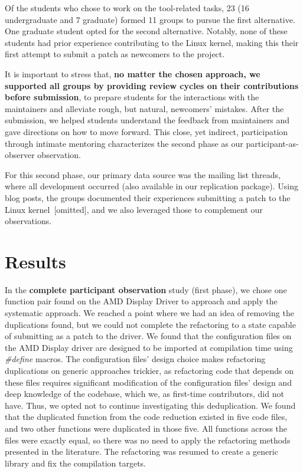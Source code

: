 \documentclass[10pt,conference]{IEEEtran}
\begin{document}
Of the students who chose to work on the tool-related tasks, 23 (16 undergraduate and 7 graduate) formed 11 groups to pursue the first alternative. One graduate student opted for the second alternative. Notably, none of these students had prior experience contributing to the Linux kernel, making this their first attempt to submit a patch as newcomers to the project.

It is important to stress that, \textbf{no matter the chosen approach, we supported all groups by providing review cycles on their contributions before submission}, to prepare students for the interactions with the maintainers and alleviate rough, but natural, newcomers' mistakes. After the submission, we helped students understand the feedback from maintainers and gave directions on how to move forward. This close, yet indirect, participation through intimate mentoring characterizes the second phase as our participant-as-observer observation.

For this second phase, our primary data source was the mailing list threads, where all development occurred (also available in our replication package). Using blog posts, the groups documented their experiences submitting a patch to the Linux kernel~[omitted], and we also leveraged those to complement our observations. %

\vspace{-.2cm}
\section{Results}

In the \textbf{complete participant observation} study (first phase), we chose one function pair found on the AMD Display Driver to approach and apply the systematic approach.
%
We reached a point where we had an idea of removing the duplications found, but we could not complete the refactoring to a state capable of submitting as a patch to the driver. We found that the configuration files on the AMD Display driver are designed to be imported at compilation time using \textit{\#define} macros. The configuration files' design choice makes refactoring duplications on generic approaches trickier, as refactoring code that depends on these files requires significant modification of the configuration files' design and deep knowledge of the codebase, which we, as first-time contributors, did not have. Thus, we opted not to continue investigating this deduplication. We found that the duplicated function from the code reduction existed in five code files, and two other functions were duplicated in those five. All functions across the files were exactly equal, so there was no need to apply the refactoring methods presented in the literature. The refactoring was resumed to create a generic library and fix the compilation targets.
\end{document}
